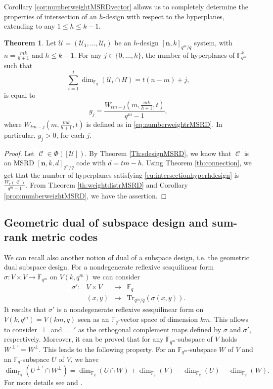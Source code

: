 \documentclass[11pt]{amsart}
\DeclareMathOperator{\C}{\mathcal{C}}
\theoremstyle{definition}
\newtheorem{theorem}{Theorem}[section]
\newcommand{\F}{{\mathbb F}}
\newcommand{\U}{{\mathcal{U}}}
\newcommand{\bfn}{\mathbf {n}}
\newcommand{\fq}{{\mathbb F}_{q}}
\newcommand{\Fmnkd}{[\bfn,k,d]_{q^m/q}}
\begin{document}
{Corollary \ref{cor:numberweightMSRDvector} allows us to completely determine the properties of intersection of an $h$-design with respect to the hyperplanes, extending \cite[Theorem 5.12]{santonastaso2022subspace} to any $1 \leq h \leq k-1$.

\begin{theorem} \label{th:numberhyperplaneshdesign}
    Let $\U=(\mathcal{U}_1,\ldots,\mathcal{U}_t)$ be an $h$-design $[\bfn,k]_{q^m/q}$ system, with $n=\frac{mk}{h+1}$ and $h \leq k-1$. For any $j \in \{0,\ldots,h\}$, the number of hyperplanes of $\F_{q^m}^k$ such that
\begin{equation} \label{eq:intersectionhyperhdesign}
 \sum_{i=1}^t \dim_{\F_q}(\mathcal{U}_i \cap H) = t \left(n-m \right)+j,
\end{equation}
is equal to \[g_j=\frac{W_{tm-j}\left(m,\frac{mk}{h+1},t\right)}{q^m-1},\]
where $W_{tm-j}\left(m,\frac{mk}{h+1},t\right)$ is defined as in \eqref{eq:numberweightrMSRD}.
In particular, $g_j>0$, for each $j$.
\end{theorem}

\begin{proof}
Let $\C \in \Phi([\U])$. By Theorem \ref{Th:sdesignMSRD}, we know that $\C$ is an MSRD $\Fmnkd$ code with $d=tm-h$. Using Theorem \ref{th:connection}, we get that the number of hyperplanes satisfying \eqref{eq:intersectionhyperhdesign} is $\frac{W_r(\C)}{q^m-1}$. From Theorem \ref{th:weightdistrMSRD} and Corollary \ref{prop:numberweightMSRD}, we have the assertion.
\end{proof}


\subsection{Geometric dual of subspace design and sum-rank metric codes}

We can recall also another notion of dual of a subspace design, i.e. the geometric dual subspace design.
For a nondegenerate reflexive sesquilinear form $\sigma \colon V \times V \rightarrow \F_{q^m}$ on $V(k,q^m)$  we can consider \[
\begin{array}{cccc}
    \sigma': & V \times V & \longrightarrow & \F_q  \\
     & (x,y) & \longmapsto & \mathrm{Tr}_{q^m/q} (\sigma(x,y)).
\end{array}
\] 
It results that $\sigma'$ is a nondegenerate reflexive sesquilinear form on $V(k,q^m)=V(km,q)$ seen as an $\fq$-vector space of dimension $km$. This allows to consider $\perp$ and $\perp'$ as the orthogonal complement maps defined by $\sigma$ and $\sigma'$, respectively. Moreover, it can be proved that for any $\F_{q^m}$-subspace of $V$ holds $W^{\perp'}=W^{\perp}$.
This leads to the following property. For an $\F_{q^m}$-subspace $W$ of $V$ and an $\F_q$-subspace $U$ of $V$, we have 
\begin{equation}\label{eq:dualord}
\dim_{\fq}(U^{\perp'}\cap W^{\perp})=\dim_{\fq}(U\cap W)+\dim_{\fq}(V)-\dim_{\fq}(U)-\dim_{\fq}(W).
\end{equation}
For more details see \cite[section 7]{taylor1992geometry} and \cite[Property 2.6]{polverino2010linear}.

}
\end{document}
